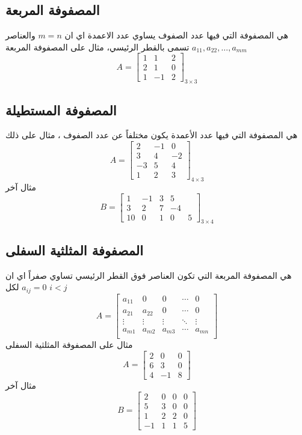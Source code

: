 	
	\subsection{المصفوفة المربعة}
	هي المصفوفة التي فيها عدد الصفوف يساوي عدد الاعمدة اي ان $m=n$ والعناصر $a_{11}, a_{22}, \dots, a_{mm}$ تسمى بالقطر الرئيسي، مثال على المصفوفة المربعة
	\[
	A=
	\begin{bmatrix}
		1&1&2\\
		2&1&0\\
		1&-1&2
	\end{bmatrix}_{3\times 3}
	\]
	
	\subsection{المصفوفة المستطيلة}
	هي المصفوفة التي فيها عدد الأعمدة يكون مختلفاً عن عدد الصفوف ، مثال على ذلك
	\[
	A = \begin{bmatrix}
		2&-1&0\\
		3&4&-2\\
		-3&5&4\\
		1&2&3
	\end{bmatrix}_{4\times 3}
	\]
	مثال آخر
	\[
	B= 
	\begin{bmatrix}
		1&-1&3&5\\
		3&2&7&-4\\
		10&0&1&0&5
	\end{bmatrix}_{3\times 4}
	\]
	
	\subsection{المصفوفة المثلثية السفلى}
	هي المصفوفة المربعة التي تكون العناصر فوق القطر الرئيسي تساوي صفراً اي ان 
	$a_{ij} = 0$ لكل $i < j$
	\[
	A =
	\begin{bmatrix}
		a_{11} & 0 & 0 & \cdots & 0\\
		a_{21} & a_{22} & 0& \cdots & 0\\
		\vdots & \vdots & \vdots & \ddots & \vdots\\
		a_{m1} & a_{m2} & a_{m3} & \cdots & a_{mn}\\
	\end{bmatrix}
	\]
	مثال على المصفوفة المثلثية السفلى 
	\[
	A=
	\begin{bmatrix}
		2&0&0\\
		6&3&0\\
		4&-1&8
	\end{bmatrix}
	\]
	مثال آخر
	\[
	B=
	\begin{bmatrix}
		2&0&0&0\\
		5&3&0&0\\
		1&2&2&0\\
		-1&1&1&5
	\end{bmatrix}
	\]
	

